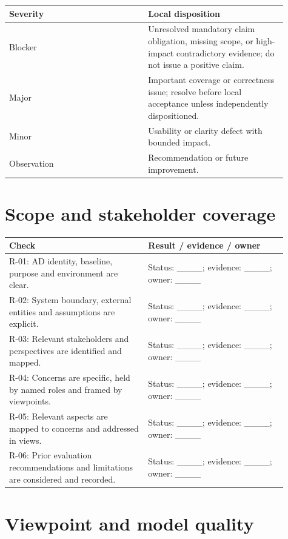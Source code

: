 \documentclass[11pt,letterpaper]{article}
\newcommand{\docsection}[1]{\Needspace{5\baselineskip}\section{#1}}
\begin{document}
\begin{longtable}{@{}>{\RaggedRight\arraybackslash}p{0.457\linewidth}>{\RaggedRight\arraybackslash}p{0.457\linewidth}@{}}
\toprule
\textbf{Severity} & \textbf{Local disposition}\\\midrule
\endhead
Blocker & Unresolved mandatory claim obligation, missing scope, or high-impact contradictory evidence; do not issue a positive claim.\\
Major & Important coverage or correctness issue; resolve before local acceptance unless independently dispositioned.\\
Minor & Usability or clarity defect with bounded impact.\\
Observation & Recommendation or future improvement.\\
\bottomrule
\end{longtable}
\docsection{Scope and stakeholder coverage}
\begin{longtable}{@{}>{\RaggedRight\arraybackslash}p{0.457\linewidth}>{\RaggedRight\arraybackslash}p{0.457\linewidth}@{}}
\toprule
\textbf{Check} & \textbf{Result / evidence / owner}\\\midrule
\endhead
R-01: AD identity, baseline, purpose and environment are clear. & 
Status: \_\_\_\_; evidence: \_\_\_\_; owner: \_\_\_\_\\
R-02: System boundary, external entities and assumptions are explicit. & 
Status: \_\_\_\_; evidence: \_\_\_\_; owner: \_\_\_\_\\
R-03: Relevant stakeholders and perspectives are identified and mapped. & 
Status: \_\_\_\_; evidence: \_\_\_\_; owner: \_\_\_\_\\
R-04: Concerns are specific, held by named roles and framed by viewpoints. & 
Status: \_\_\_\_; evidence: \_\_\_\_; owner: \_\_\_\_\\
R-05: Relevant aspects are mapped to concerns and addressed in views. & 
Status: \_\_\_\_; evidence: \_\_\_\_; owner: \_\_\_\_\\
R-06: Prior evaluation recommendations and limitations are considered and recorded. & 
Status: \_\_\_\_; evidence: \_\_\_\_; owner: \_\_\_\_\\
\bottomrule
\end{longtable}
\docsection{Viewpoint and model quality}
\end{document}
